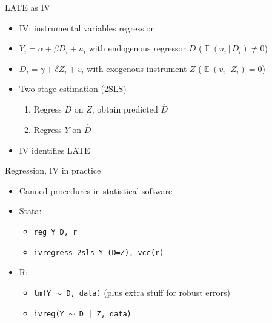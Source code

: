 \documentclass[aspectratio=169,compress,handout,t,xcolor=table]{beamer}
\DeclareMathOperator{\E}{\mathbb{E}}                       %
\begin{document}
\begin{frame}{LATE as IV}
  \begin{itemize}
    \item IV: instrumental variables regression
    \item \(Y_i = \alpha + \beta D_i + u_i\) with endogenous regressor \(D\) (\(\E(u_i \,|\, D_i) \neq 0\))
    \item \(D_i = \gamma + \delta Z_i + v_i\) with exogenous instrument \(Z\) (\(\E(v_i \,|\, Z_i) = 0\))
    \item Two-stage estimation (2SLS)
    \begin{enumerate}
      \item Regress \(D\) on \(Z\), obtain predicted \(\hat{D}\)
      \item Regress \(Y\) on \(\hat{D}\)
    \end{enumerate}
    \item IV identifies LATE
  \end{itemize}
\end{frame}

\begin{frame}{Regression, IV in practice}
  \begin{itemize}
    \item Canned procedures in statistical software 
    \item Stata:
    \begin{itemize}
      \item \texttt{reg Y D, r}
      \item \texttt{ivregress 2sls Y (D=Z), vce(r)}
    \end{itemize}
    \item R:
    \begin{itemize}
      \item \texttt{lm(Y \(\sim\) D, data)} \qquad \qquad (plus extra stuff for robust errors)
      \item \texttt{ivreg(Y \(\sim\) D | Z, data)}
    \end{itemize}
  \end{itemize}
\end{frame}
\end{document}
